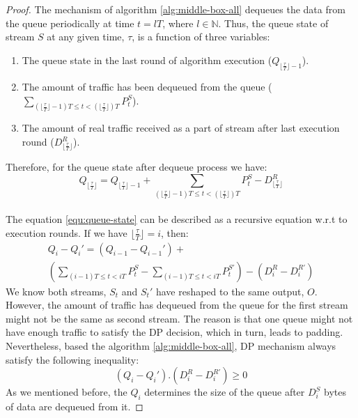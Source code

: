\begin{proof}
The mechanism of algorithm \ref{alg:middle-box-all} dequeues the data from
the queue periodically at time $t=lT$, where $l \in \mathbb{N}$.
Thus, the queue state of stream $S$ at any given time, $\tau$,
is a function of three variables:
\begin{enumerate}
        \item The queue state in the last round of algorithm execution ($Q_{\lfloor \frac{\tau}{T} \rfloor -1}$).
        \item The amount of traffic has been dequeued from the queue ($\sum_{(\lfloor \frac{\tau}{T} \rfloor  - 1)T \leq t < (\lfloor \frac{\tau}{T} \rfloor)T} P^S_t$).
        \item The amount of real traffic received as a part of stream after last
        execution round ($D^{R}_{\lfloor \frac{\tau}{T} \rfloor}$).
\end{enumerate}
Therefore, for the queue state after dequeue process we have:
\begin{equation}
                \label{equ:queue-state}
                Q_{\lfloor \frac{\tau}{T} \rfloor} =
                {Q_{\lfloor \frac{\tau}{T} \rfloor -1}}
                +
                {\sum_{(\lfloor \frac{\tau}{T} \rfloor  - 1)T \leq t < (\lfloor \frac{\tau}{T} \rfloor)T} P^S_t}
                -
                {D^{R}_{\lfloor \frac{\tau}{T} \rfloor}}
\end{equation}
\\
The equation \ref{equ:queue-state} can be described as a recursive equation
w.r.t to execution rounds.
If we have $\lfloor \frac{\tau}{T} \rfloor = i$, then:
\begin{align}\label{equ:queue_state_expansion}
        Q_{i} - Q_{i}'
        =
        (Q_{i-1} - Q_{i-1}')
        +
        \\ \nonumber
        (\sum_{(i - 1)T \leq t < iT}P^S_t
        -
        \sum_{(i - 1)T \leq t < iT}P^{S'}_t)
        -
        (D^{R}_{i} - D^{R'}_{i})
\end{align}
We know both streams, $S_t$ and $S_t'$ have reshaped to the same output, $O$.
However, the amount of traffic has dequeued from the queue for the first stream
might not be the same as second stream.
The reason is that one queue might not have enough traffic to satisfy
the DP decision, which in turn, leads to padding.
Nevertheless, based the algorithm \ref*{alg:middle-box-all}, DP mechanism always
satisfy the following inequality:
\begin{equation}\label{equ:queue-dequeue}
        (Q_{i} - Q_{i}').(D^{R}_{i} - D^{R'}_{i}) \geq 0
\end{equation}
As we mentioned before, the $Q_i$ determines the size of the queue after $D_i^S$
bytes of data are dequeued from it.


\end{proof}

